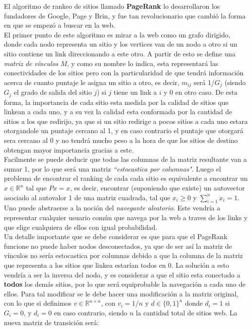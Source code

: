 El algoritmo de rankeo de sitios  llamado \textbf{PageRank} lo desarrollaron los fundadores de Google, Page y Brin, y fue tan revolucionario que cambió la forma en que se empezó a buscar en la web. \\
El primer punto de este algoritmo es mirar a la web como un grafo dirigido, donde cada nodo representa un sitio y los vertices van de un nodo a otro si un sitio contiene un link direccionando a este otro.
A partir de esto se define una \emph{matriz de vínculos} $M$, y como su nombre lo indica, esta representará las conectividades de los sitios pero con la particularidad de que tendrá información acerca de cuanto puntaje le asigna un sitio a otro, es decir, $m_{ij}$ será 1/$G_j$  (siendo $G_j$ el grado de salida del sitio $j$) si $j$ tiene un link a $i$ y 0 en otro caso.
De esta forma, la importancia de cada sitio esta medida por la calidad de sitios que linkean a cada uno, y a su vez la calidad esta conformada por la cantidad de sitios a los que redirijo, ya que si un sitio redirige a pocos sitios a cada uno estara otorgandole un puntaje cercano al 1, y en caso contrario el puntaje que otorgará sera cercano al 0 y no tendrá mucho peso a la hora de que los sitios de destino obtengan mayor importancia gracias a este.\\
Facilmente se puede deducir que todas las columnas de la matriz resultante van a sumar 1, por lo que será una matriz \textit{``estocastica por columnas"}. Luego el problema de encontrar el ranking de cada cada sitio es equivalente a encontrar un $x\in \mathbb{R}^n$ tal que $Px = x$, es decir, encontrar (suponiendo que existe) un autovector asociado al autovalor 1 de una matriz cuadrada, tal que $x_i \ge
0$ y $\sum_{i = 1}^n x_i = 1$. 
\\
Uno puede abstraerse a la noción del \emph{navegante aleatorio}. Este vendría a representar cualquier usuario común que navega por la web a traves de los links y que elige cualquiera de ellos con igual probabilidad.
\\
Un detalle importante que se debe considerar es que para que el PageRank funcione no puede haber nodos desconectados, ya que de ser así la matriz de vínculos no sería estocastica por columnas debido a que la columna de la matriz que representa a los sitios que linkea estarían todos en 0. La solución a esto vendría a ser la inversa del nodo, y es considerar a que el sitio esta conectado a \textbf{todos} los demás sitios, por lo que será equiprobable la navegación a cada uno de ellos. Para tal modificar se le debe hacer una modificación a la matriz original, con lo que si definimos $v \in \mathbb{R}^{n \times n}$, con $v_i = 1/n$ y $d \in \{0,1\}^{n}$ donde 
$d_i = 1$ si $G_i = 0$, y $d_i = 0$ en caso contrario, siendo $n$ la cantidad total de sitios web. La nueva matriz de transici\'on será:


